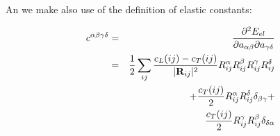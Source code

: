 




An we make also use of the definition of elastic constants:

\begin{eqnarray}\label{elconst}
c^{\alpha\beta\gamma\delta} &= &
\frac{\partial^2E_{el}}{\partial a_{\alpha\beta} \partial a_{\gamma\delta}} \\
&=& \frac{1}{2}\sum_{ij}\frac{c_L(ij)-c_T(ij)}{|\mathbf R_{ij}|^2} 
R_{ij}^{\alpha}R_{ij}^{\beta}R_{ij}^{\gamma}R_{ij}^{\delta}
 \nonumber \\
&& +    \frac{c_T(ij)}{2} R_{ij}^{\alpha}R_{ij}^{\delta}
 \delta_{\beta\gamma}  + \nonumber \\
&& \frac{c_T(ij)}{2} R_{ij}^{\gamma} R_{ij}^{\beta}
 \delta_{\delta\alpha} 
\end{eqnarray}



